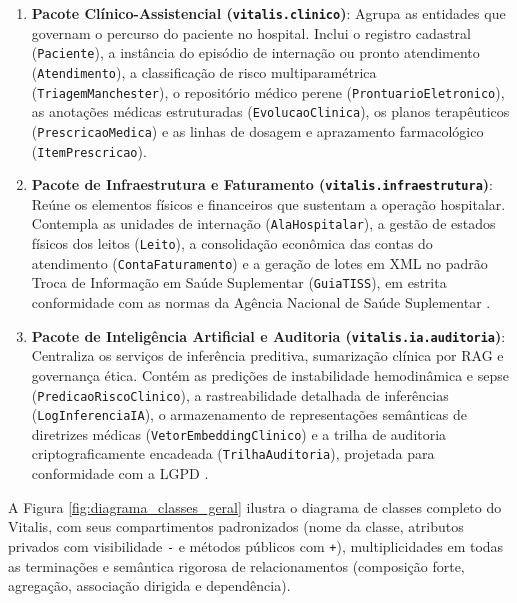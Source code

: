 \begin{enumerate}[leftmargin=*]
    \item \textbf{Pacote Clínico-Assistencial (\texttt{vitalis.clinico})}: Agrupa as entidades que governam o percurso do paciente no hospital. Inclui o registro cadastral (\texttt{Paciente}), a instância do episódio de internação ou pronto atendimento (\texttt{Atendimento}), a classificação de risco multiparamétrica (\texttt{TriagemManchester}), o repositório médico perene (\texttt{ProntuarioEletronico}), as anotações médicas estruturadas (\texttt{EvolucaoClinica}), os planos terapêuticos (\texttt{PrescricaoMedica}) e as linhas de dosagem e aprazamento farmacológico (\texttt{ItemPrescricao}).
    \item \textbf{Pacote de Infraestrutura e Faturamento (\texttt{vitalis.infraestrutura})}: Reúne os elementos físicos e financeiros que sustentam a operação hospitalar. Contempla as unidades de internação (\texttt{AlaHospitalar}), a gestão de estados físicos dos leitos (\texttt{Leito}), a consolidação econômica das contas do atendimento (\texttt{ContaFaturamento}) e a geração de lotes em XML no padrão Troca de Informação em Saúde Suplementar (\texttt{GuiaTISS}), em estrita conformidade com as normas da Agência Nacional de Saúde Suplementar \cite{ans_tiss:2023}.
    \item \textbf{Pacote de Inteligência Artificial e Auditoria (\texttt{vitalis.ia.auditoria})}: Centraliza os serviços de inferência preditiva, sumarização clínica por RAG e governança ética. Contém as predições de instabilidade hemodinâmica e sepse (\texttt{PredicaoRiscoClinico}), a rastreabilidade detalhada de inferências (\texttt{LogInferenciaIA}), o armazenamento de representações semânticas de diretrizes médicas (\texttt{VetorEmbeddingClinico}) e a trilha de auditoria criptograficamente encadeada (\texttt{TrilhaAuditoria}), projetada para conformidade com a LGPD \cite{brasil_lgpd:2018}.
\end{enumerate}

A Figura \ref{fig:diagrama_classes_geral} ilustra o diagrama de classes completo do Vitalis, com seus compartimentos padronizados (nome da classe, atributos privados com visibilidade \texttt{-} e métodos públicos com \texttt{+}), multiplicidades em todas as terminações e semântica rigorosa de relacionamentos (composição forte, agregação, associação dirigida e dependência).

